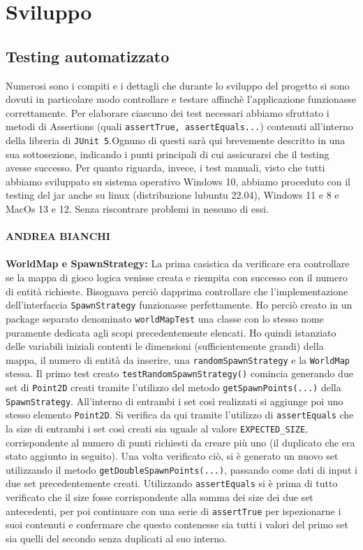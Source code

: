 \documentclass[a4paper,12pt]{report}
\begin{document}
\chapter{Sviluppo}
\section{Testing automatizzato}
Numerosi sono i compiti e i dettagli che durante lo sviluppo del progetto si sono dovuti in particolare modo controllare e testare affinchè l'applicazione funzionasse correttamente. Per elaborare ciascuno dei test necessari abbiamo sfruttato i metodi di Assertions (quali \verb|assertTrue, assertEquals...|) contenuti all'interno della libreria di \verb|JUnit 5|.Ognuno di questi sarà qui brevemente descritto in una sua sottosezione, indicando i punti principali di cui assicurarsi che il testing avesse successo.
Per quanto riguarda, invece, i test manuali, visto che tutti abbiamo sviluppato su sistema operativo Windows 10, abbiamo proceduto con il testing del jar anche su linux (distribuzione lubuntu 22.04), Windows 11 e 8 e MacOs 13 e 12. Senza riscontrare problemi in nessuno di essi. 
\\ \\
\textbf{ANDREA BIANCHI}
\\ \\
\textbf{WorldMap e SpawnStrategy: }
La prima casistica da verificare era controllare se la mappa di gioco logica venisse creata e riempita con successo con il numero di entità richieste. Bisognava perciò dapprima controllare che l'implementazione dell'interfaccia \verb|SpawnStrategy| funzionasse perfettamente. Ho perciò creato in un package separato denominato \verb|worldMapTest| una classe con lo stesso nome puramente dedicata agli scopi precedentemente elencati. Ho quindi istanziato delle variabili iniziali contenti le dimensioni (sufficientemente grandi) della mappa, il numero di entità da inserire, una \verb|randomSpawnStrategy| e la \verb|WorldMap| stessa.
Il primo test creato \verb|testRandomSpawnStrategy()| comincia generando due set di \verb|Point2D| creati tramite l'utilizzo del metodo \verb|getSpawnPoints(...)| della \verb|SpawnStrategy|.
All'interno di entrambi i set così realizzati si aggiunge poi uno stesso elemento \verb|Point2D|. Si verifica da qui tramite l'utilizzo di \verb|assertEquals| che la size di entrambi i set così creati sia uguale al valore \verb|EXPECTED_SIZE|, corrispondente al numero di punti richiesti da creare più uno (il duplicato che era stato aggiunto in seguito).
Una volta verificato ciò, si è generato un nuovo set utilizzando il metodo \verb|getDoubleSpawnPoints(...)|, passando come dati di input i due set precedentemente creati. Utilizzando \verb|assertEquals| si è prima di tutto verificato che il size fosse corrispondente alla somma dei size dei due set antecedenti, per poi continuare con una serie di \verb|assertTrue| per ispezionarne i suoi contenuti e confermare che questo contenesse sia tutti i valori del primo set sia quelli del secondo senza duplicati al suo interno.
\end{document}
